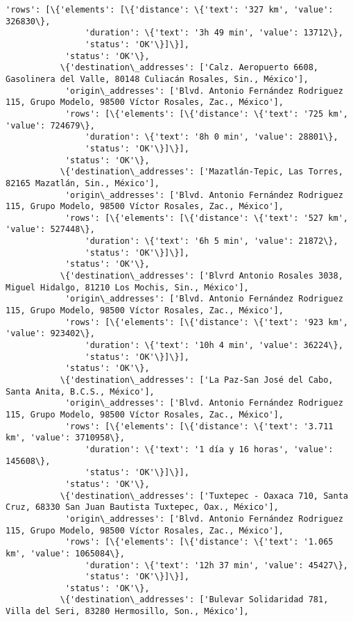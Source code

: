 \documentclass[11pt]{article}
\begin{document}
\begin{Verbatim}[commandchars=\\\{\}]
            'rows': [\{'elements': [\{'distance': \{'text': '327 km', 'value': 326830\},
                'duration': \{'text': '3h 49 min', 'value': 13712\},
                'status': 'OK'\}]\}],
            'status': 'OK'\},
           \{'destination\_addresses': ['Calz. Aeropuerto 6608, Gasolinera del Valle, 80148 Culiacán Rosales, Sin., México'],
            'origin\_addresses': ['Blvd. Antonio Fernández Rodriguez 115, Grupo Modelo, 98500 Víctor Rosales, Zac., México'],
            'rows': [\{'elements': [\{'distance': \{'text': '725 km', 'value': 724679\},
                'duration': \{'text': '8h 0 min', 'value': 28801\},
                'status': 'OK'\}]\}],
            'status': 'OK'\},
           \{'destination\_addresses': ['Mazatlán-Tepic, Las Torres, 82165 Mazatlán, Sin., México'],
            'origin\_addresses': ['Blvd. Antonio Fernández Rodriguez 115, Grupo Modelo, 98500 Víctor Rosales, Zac., México'],
            'rows': [\{'elements': [\{'distance': \{'text': '527 km', 'value': 527448\},
                'duration': \{'text': '6h 5 min', 'value': 21872\},
                'status': 'OK'\}]\}],
            'status': 'OK'\},
           \{'destination\_addresses': ['Blvrd Antonio Rosales 3038, Miguel Hidalgo, 81210 Los Mochis, Sin., México'],
            'origin\_addresses': ['Blvd. Antonio Fernández Rodriguez 115, Grupo Modelo, 98500 Víctor Rosales, Zac., México'],
            'rows': [\{'elements': [\{'distance': \{'text': '923 km', 'value': 923402\},
                'duration': \{'text': '10h 4 min', 'value': 36224\},
                'status': 'OK'\}]\}],
            'status': 'OK'\},
           \{'destination\_addresses': ['La Paz-San José del Cabo, Santa Anita, B.C.S., México'],
            'origin\_addresses': ['Blvd. Antonio Fernández Rodriguez 115, Grupo Modelo, 98500 Víctor Rosales, Zac., México'],
            'rows': [\{'elements': [\{'distance': \{'text': '3.711 km', 'value': 3710958\},
                'duration': \{'text': '1 día y 16 horas', 'value': 145608\},
                'status': 'OK'\}]\}],
            'status': 'OK'\},
           \{'destination\_addresses': ['Tuxtepec - Oaxaca 710, Santa Cruz, 68330 San Juan Bautista Tuxtepec, Oax., México'],
            'origin\_addresses': ['Blvd. Antonio Fernández Rodriguez 115, Grupo Modelo, 98500 Víctor Rosales, Zac., México'],
            'rows': [\{'elements': [\{'distance': \{'text': '1.065 km', 'value': 1065084\},
                'duration': \{'text': '12h 37 min', 'value': 45427\},
                'status': 'OK'\}]\}],
            'status': 'OK'\},
           \{'destination\_addresses': ['Bulevar Solidaridad 781, Villa del Seri, 83280 Hermosillo, Son., México'],

\end{Verbatim}
\end{document}
